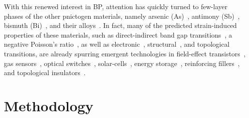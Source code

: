 With this renewed interest in BP, 
attention has quickly turned to 
few-layer phases of the other pnictogen materials, namely 
arsenic (As)~\cite{PhysRevB.91.085423}, 
antimony (Sb)~\cite{doi:10.1021/acsami.5b02441}, 
bismuth (Bi)~\cite{PhysRevB.91.075429,doi:10.1021/nl502997v}, 
and their alloys~\cite{doi:10.1021/acs.nanolett.5b02227,doi:10.1021/acs.jpcc.5b07323,Xie2016433,ADMA:ADMA201501758,doi:10.1021/acs.jpcc.5b02096}.
%
In fact, many of the predicted strain-induced properties 
of these materials, such as 
direct-indirect band gap transitions~\cite{ANIE:ANIE201411246,PhysRevB.91.085423,doi:10.1021/acsami.5b02441,PhysRevB.90.085402,0957-4484-26-7-075701},
a negative Poisson's ratio~\cite{Jiang2014,1882-0786-8-4-041801},
as well as 
electronic~\cite{PhysRevLett.113.046804,PhysRevB.91.161404,ANIE:ANIE201411246}, 
structural~\cite{PhysRevB.92.064114}, 
and 
topological~\cite{Lu2016,PhysRevLett.115.186403,PhysRevB.93.195434,PhysRevB.91.195319} transitions, 
are already spurring emergent technologies in  
field-effect transistors~\cite{doi:10.1021/nn501226z,C4CS00257A},
gas sensors~\cite{doi:10.1021/acsnano.5b01961,doi:10.1021/jz501188k}, 
optical switches~\cite{PhysRevB.90.075434,1347-4065-28-11A-2104}, 
solar-cells~\cite{Xie2016433},
energy storage~\cite{ADMA:ADMA200602592,doi:10.1021/jp302265n,Sun2015},
 reinforcing fillers~\cite{PMID:26469634,doi:10.1021/nl501617j}, 
 and topological insulators~\cite{PhysRevLett.115.186403,Lu2016,PhysRevB.93.195434,PhysRevB.91.195319,Yao2013}.



\section{Methodology}
\label{sec:methodology1}
